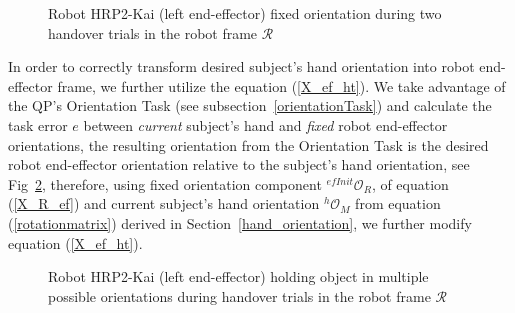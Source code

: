 \begin{figure}[h]
	\caption{Robot HRP2-Kai (left end-effector) fixed orientation during two handover trials in the robot frame $\mathcal{R}$}
	\label{fig:robot_lt_hand_2layers}
\end{figure} 


In order to correctly transform desired subject's hand orientation into robot end-effector frame, we further utilize the equation (\ref{X_ef_ht}). We take advantage of the QP's Orientation Task (see subsection~\ref{orientationTask}) and calculate the task error $e$ between \textit{current} subject's hand and \textit{fixed} robot end-effector orientations,
the resulting orientation from the Orientation Task is the desired robot end-effector orientation relative to the subject's hand orientation, see Fig~\ref{fig:robot_lt_orientations}, therefore, using fixed orientation component  ${{}^{efInit}\mathcal{O}_R}$, of equation (\ref{X_R_ef}) and current subject's hand orientation ${}^{h}\mathcal{O}_M$ from equation (\ref{rotationmatrix}) derived in Section~\ref{hand_orientation}, we further modify equation (\ref{X_ef_ht}).

\begin{figure}[h]
	\caption{Robot HRP2-Kai (left end-effector) holding object in multiple possible orientations during handover trials in the robot frame $\mathcal{R}$}
	\label{fig:robot_lt_orientations}
\end{figure} 


